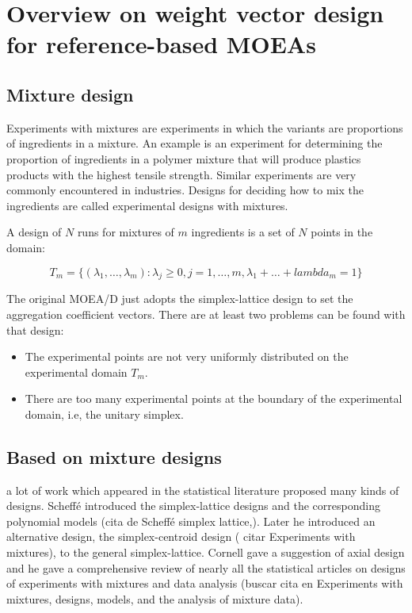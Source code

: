 \documentclass[a4paper,10pt]{llncs}
\begin{document}
\section{Overview on weight vector design for reference-based MOEAs}

\subsection{Mixture design}

Experiments with mixtures are experiments in which the variants are proportions of ingredients in a mixture. An example is an experiment for determining the proportion of ingredients in a polymer mixture that will produce plastics products with the
highest tensile strength. Similar experiments are very commonly encountered in industries. Designs for deciding how to mix the ingredients are called experimental designs with mixtures.

A design of $N$ runs for mixtures of $m$ ingredients is a set of $N$ points in the domain:

\begin{equation}
T_m = \{ ( \lambda_1, \dots, \lambda_m ):\lambda_j \geq 0, j=1, \dots,m, \lambda_1 + \dots + lambda_m  = 1 \}
\end{equation}

The original MOEA/D\cite{4358754} just adopts the simplex-lattice design to set the aggregation coefficient vectors. There are at least two problems can be found with that design:
\begin{itemize}
 \item The experimental points are not very uniformly distributed on the experimental domain $T_m$.
 \item There are too many experimental points at the boundary of the experimental domain, i.e, the unitary simplex.
\end{itemize}

\subsection{Based on mixture designs}

a lot of work which appeared in the statistical literature proposed many kinds of designs. Scheff\'e introduced the simplex-lattice designs and the corresponding
polynomial models (cita de Scheff\'e simplex lattice,). Later he introduced an alternative design, the simplex-centroid design ( citar Experiments with mixtures), to the general simplex-lattice. Cornell gave a suggestion of axial design and
he gave a comprehensive review of nearly all the statistical articles on designs of experiments with mixtures and data analysis (buscar cita en Experiments with mixtures, designs, models, and the analysis of
mixture data).
\end{document}
